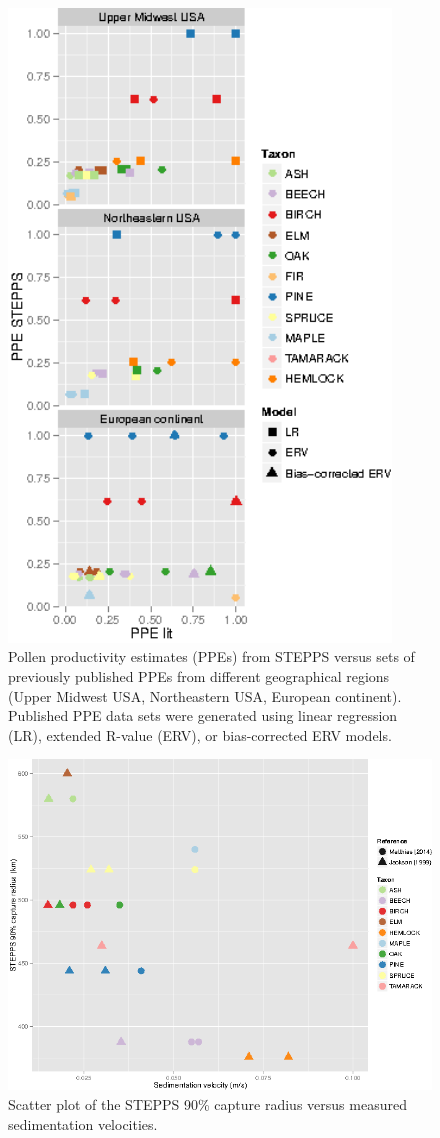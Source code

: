 \begin{figure}
\centering
\includegraphics[width=4in]{figures/PPEs_panels.png}
\caption{Pollen productivity estimates (PPEs) from STEPPS versus sets
  of previously published PPEs from different geographical regions
  (Upper Midwest USA, Northeastern USA, European continent). Published
  PPE data sets were generated using linear regression (LR), extended
  R-value (ERV), or bias-corrected ERV models.}
\label{fig:ppe}
\end{figure}

\begin{figure}
\centering
\includegraphics[width=7in]{figures/SVs_90_single.png}
\caption{Scatter plot of the STEPPS 90\% capture radius versus
  measured sedimentation velocities.}
\label{fig:svs}
\end{figure}

